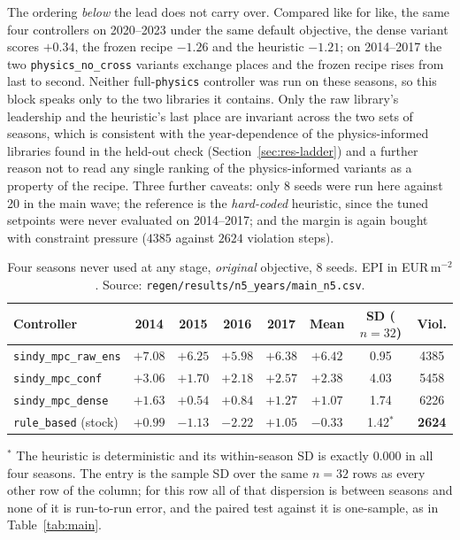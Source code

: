 The ordering \emph{below} the lead does not carry over. Compared like for like, the same four controllers on 2020--2023 under the same default objective, the dense variant
scores $+0.34$, the frozen recipe $-1.26$ and the heuristic $-1.21$; on 2014--2017 the two
\texttt{physics\_no\_cross} variants exchange places and the frozen recipe rises from last
to second. Neither full-\texttt{physics} controller was run on these seasons, so this block
speaks only to the two libraries it contains. Only the
raw library's leadership and the heuristic's last place are invariant across the two sets
of seasons, which is consistent with the year-dependence of the physics-informed libraries
found in the held-out check (Section~\ref{sec:res-ladder}) and a further reason not to read
any single ranking of the physics-informed variants as a property of the recipe. Three
further caveats:
only 8 seeds were run
here against 20 in the main wave; the reference is the \emph{hard-coded} heuristic, since
the tuned setpoints were never evaluated on 2014--2017; and the margin is again bought with
constraint pressure ($4385$ against $2624$ violation steps).

\begin{table}[t]
\centering
\caption{Four seasons never used at any stage, \emph{original} objective, 8 seeds. EPI in
EUR\,m$^{-2}$. Source: \texttt{regen/results/n5\_years/main\_n5.csv}.}
\label{tab:unseen}
\small
\begin{tabular}{@{}lccccccc@{}}
\toprule
Controller & 2014 & 2015 & 2016 & 2017 & Mean & SD ($n=32$) & Viol. \\
\midrule
\texttt{sindy\_mpc\_raw\_ens} & $+7.08$ & $+6.25$ & $+5.98$ & $+6.38$ & $\mathbf{+6.42}$ & 0.95 & 4385 \\
\texttt{sindy\_mpc\_conf}     & $+3.06$ & $+1.70$ & $+2.18$ & $+2.57$ & $+2.38$ & 4.03 & 5458 \\
\texttt{sindy\_mpc\_dense}    & $+1.63$ & $+0.54$ & $+0.84$ & $+1.27$ & $+1.07$ & 1.74 & 6226 \\
\texttt{rule\_based} (stock)  & $+0.99$ & $-1.13$ & $-2.22$ & $+1.05$ & $-0.33$ & 1.42$^{*}$ & \textbf{2624} \\
\bottomrule
\end{tabular}

\vspace{2pt}
\begin{minipage}{\linewidth}\footnotesize
$^{*}$ The heuristic is deterministic and its within-season SD is exactly $0.000$ in all
four seasons. The entry is the sample SD over the same $n=32$ rows as every other row of
the column; for this row all of that dispersion is between seasons and none of it is
run-to-run error, and the paired test against it is one-sample, as in
Table~\ref{tab:main}.
\end{minipage}
\end{table}

